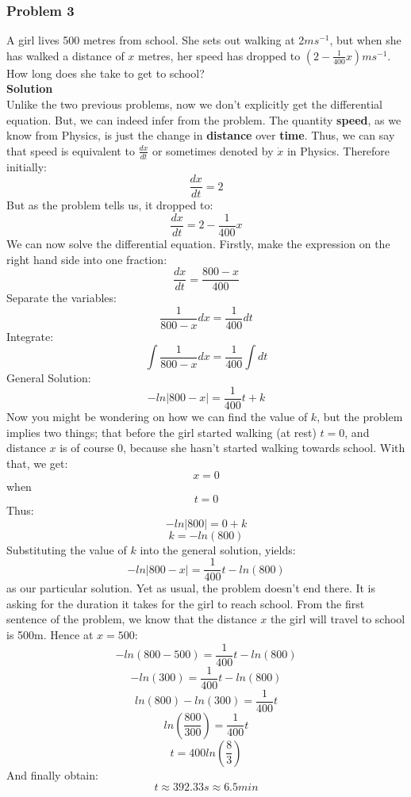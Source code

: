 \documentclass[hidelinks, a4paper, 12pt]{article}
\begin{document}
            \subsubsection{Problem 3}
                A girl lives 500 metres from school. She sets out walking at 2$ms^{-1}$, but when she has
                walked a distance of $x$ metres, her speed has dropped to $(2 - \frac{1}{400}x) ms^{-1}$.
                How long does she take to get to school?\\[\baselineskip]
                \textbf{Solution}\\
                Unlike the two previous problems, now we don't explicitly get the differential equation.
                But, we can indeed infer from the problem. The quantity \textbf{speed}, as we know from Physics,
                is just the change in \textbf{distance} over \textbf{time}. Thus, we can say that speed is equivalent
                to $\frac{dx}{dt}$ or sometimes denoted by $\dot{x}$ in Physics. Therefore initially:
                \[\frac{dx}{dt} = 2\]
                But as the problem tells us, it dropped to:
                \[\frac{dx}{dt} = 2 - \frac{1}{400}x\]
                We can now solve the differential equation. Firstly, make the expression on the right hand side into one fraction:
                \[\frac{dx}{dt} = \frac{800-x}{400}\]
                Separate the variables:
                \[\frac{1}{800-x}dx = \frac{1}{400}dt\]
                Integrate:
                \[\int \frac{1}{800-x}dx = \frac{1}{400}\int dt\]
                General Solution:
                \[-ln|800-x| = \frac{1}{400}t + k\]
                Now you might be wondering on how we can find the value of $k$, but the problem implies two things; 
                that before the girl started walking (at rest) $t = 0$, and distance $x$ is of course $0$,
                because she hasn't started walking towards school. With that, we get:
                \[x = 0\] when \[t = 0\]
                Thus:
                \[-ln|800| = 0 + k\]
                \[k = -ln(800)\]
                Substituting the value of $k$ into the general solution, yields:
                \[-ln|800-x| = \frac{1}{400}t -ln(800)\]
                as our particular solution.
                Yet as usual, the problem doesn't end there. It is asking for the duration it takes for the girl to reach school.
                From the first sentence of the problem, we know that the distance $x$ the girl will travel to school is 500m. Hence
                at $x = 500$:
                \[-ln(800-500) = \frac{1}{400}t -ln(800)\]
                \[-ln(300) = \frac{1}{400}t -ln(800)\]
                \[ln(800)-ln(300) = \frac{1}{400}t\]
                \[ln\left(\frac{800}{300}\right) = \frac{1}{400}t\]
                \[t = 400ln\left(\frac{8}{3}\right)\]
                And finally obtain:
                \[t \approx 392.33s \approx 6.5min\]
\end{document}
